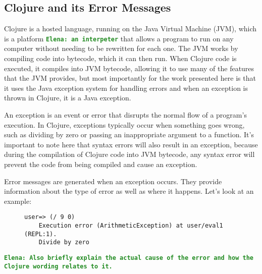 \documentclass[12pt]{article}
\newcommand{\comment}[1]{{\bf \tt  {#1}}}
\newcommand{\emcomment}[1]{\textcolor{ForestGreen}{\comment{Elena: {#1}}}}
\newcommand{\tkcomment}[1]{\textcolor{Teal}{\comment{Tristan: {#1}}}}
\begin{document}
\subsection{Clojure and its Error Messages}\label{subsec:clojure-errs}
	Clojure is a hosted language, running on the Java Virtual Machine (JVM), which is a platform \emcomment{an interpeter} that allows a program to run on any computer without needing to be rewritten for each one. 
	The JVM works by compiling code into bytecode, which it can then run. When Clojure code is executed, it compiles into JVM bytecode, allowing it to use many of the features that the JVM provides, 
	but most importantly for the work presented here is that it uses the Java exception system for handling errors and when an exception is thrown in Clojure, it is a Java exception.
    
   An exception is an event or error that disrupts the normal flow of a program’s execution. In Clojure, exceptions typically occur when something goes wrong, such as dividing by 
   zero or passing an inappropriate argument to a function. It’s important to note here that syntax errors will also result in an exception, because during the compilation of Clojure code into JVM bytecode, 
   any syntax error will prevent the code from being compiled and cause an exception.

   Error messages are generated when an exception occurs. They provide information about
   the type of error as well as where it happens. Let’s look at an example:

	\begin{figure}[h]
		\centering
		\begin{lstlisting}[breaklines=true, basicstyle=\ttfamily]
	user=> (/ 9 0)
	Execution error (ArithmeticException) at user/eval1 (REPL:1).
	Divide by zero
		\end{lstlisting}
	\end{figure}
\emcomment{Also briefly explain the actual cause of the error and how the Clojure wording relates to it.}	
\end{document}

